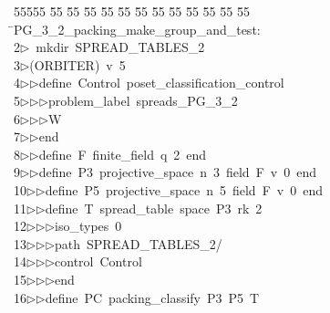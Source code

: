 %
%
\begin{tabbing}
55555 \= 55 \= 55 \= 55 \= 55 \= 55 \= 55 \= 55 \= 55 \= 55 \= 55 \= 55 \= 55 \= \>PG\_3\_2\_packing\_make\_group\_and\_test:\\[0pt]
2\>$\triangleright$\>\ mkdir\ SPREAD\_TABLES\_2\\[0pt]
3\>$\triangleright$\>(ORBITER)\ v\ 5\ \\[0pt]
4\>$\triangleright$\>$\triangleright$\>define\ Control\ poset\_classification\_control\ \\[0pt]
5\>$\triangleright$\>$\triangleright$\>$\triangleright$\>problem\_label\ spreads\_PG\_3\_2\ \\[0pt]
6\>$\triangleright$\>$\triangleright$\>$\triangleright$\>W\ \\[0pt]
7\>$\triangleright$\>$\triangleright$\>end\ \\[0pt]
8\>$\triangleright$\>$\triangleright$\>define\ F\ finite\_field\ q\ 2\ end\ \\[0pt]
9\>$\triangleright$\>$\triangleright$\>define\ P3\ projective\_space\ n\ 3\ field\ F\ v\ 0\ end\ \\[0pt]
10\>$\triangleright$\>$\triangleright$\>define\ P5\ projective\_space\ n\ 5\ field\ F\ v\ 0\ end\ \\[0pt]
11\>$\triangleright$\>$\triangleright$\>define\ T\ spread\_table\ space\ P3\ rk\ 2\ \\[0pt]
12\>$\triangleright$\>$\triangleright$\>$\triangleright$\>iso\_types\ 0\ \\[0pt]
13\>$\triangleright$\>$\triangleright$\>$\triangleright$\>path\ SPREAD\_TABLES\_2/\ \\[0pt]
14\>$\triangleright$\>$\triangleright$\>$\triangleright$\>control\ Control\ \\[0pt]
15\>$\triangleright$\>$\triangleright$\>$\triangleright$\>end\ \\[0pt]
16\>$\triangleright$\>$\triangleright$\>define\ PC\ packing\_classify\ P3\ P5\ T\ \\[0pt]

\end{tabbing}
